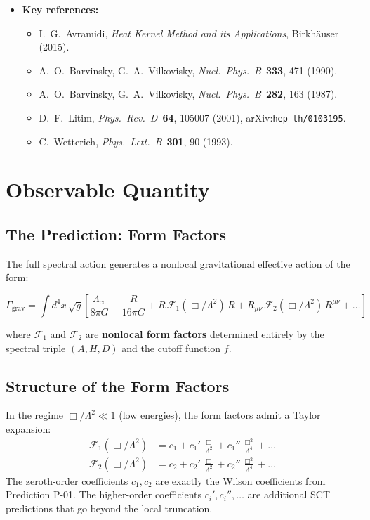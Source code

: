 \documentclass[11pt,a4paper]{article}
\begin{document}
\begin{itemize}[leftmargin=2em]
  \item \textbf{Key references:}
    \begin{itemize}
      \item I.~G.~Avramidi, \textit{Heat Kernel Method and its Applications}, Birkh\"auser (2015).
      \item A.~O.~Barvinsky, G.~A.~Vilkovisky, \textit{Nucl.\ Phys.\ B}~\textbf{333}, 471 (1990).
      \item A.~O.~Barvinsky, G.~A.~Vilkovisky, \textit{Nucl.\ Phys.\ B}~\textbf{282}, 163 (1987).
      \item D.~F.~Litim, \textit{Phys.\ Rev.\ D}~\textbf{64}, 105007 (2001), arXiv:\texttt{hep-th/0103195}.
      \item C.~Wetterich, \textit{Phys.\ Lett.\ B}~\textbf{301}, 90 (1993).
    \end{itemize}
\end{itemize}

\section{Observable Quantity}

\subsection{The Prediction: Form Factors}

The full spectral action generates a nonlocal gravitational effective action of the form:

\begin{equation}
  \boxed{
    \Gamma_{\text{grav}} = \int d^4x\,\sqrt{g}\left[
      \frac{\Lambda_{\text{cc}}}{8\pi G} - \frac{R}{16\pi G}
      + R\,\mathcal{F}_1(\Box/\Lambda^2)\,R
      + R_{\mu\nu}\,\mathcal{F}_2(\Box/\Lambda^2)\,R^{\mu\nu}
      + \ldots
    \right]
  }
  \label{eq:nonlocal-action}
\end{equation}

where $\mathcal{F}_1$ and $\mathcal{F}_2$ are \textbf{nonlocal form factors} determined entirely by the spectral triple $(A, H, D)$ and the cutoff function $f$.

\subsection{Structure of the Form Factors}

In the regime $\Box/\Lambda^2 \ll 1$ (low energies), the form factors admit a Taylor expansion:
\begin{align}
  \mathcal{F}_1(\Box/\Lambda^2) &= c_1 + c_1'\,\frac{\Box}{\Lambda^2} + c_1''\,\frac{\Box^2}{\Lambda^4} + \ldots \label{eq:F1-expansion}\\
  \mathcal{F}_2(\Box/\Lambda^2) &= c_2 + c_2'\,\frac{\Box}{\Lambda^2} + c_2''\,\frac{\Box^2}{\Lambda^4} + \ldots \label{eq:F2-expansion}
\end{align}
The zeroth-order coefficients $c_1, c_2$ are exactly the Wilson coefficients from Prediction P-01. The higher-order coefficients $c_i', c_i'', \ldots$ are additional SCT predictions that go beyond the local truncation.
\end{document}
